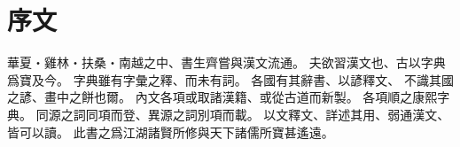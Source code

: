 \chapter*{序文}
華夏・雞林・扶桑・南越之中、書生齊嘗與漢文流通。
夫欲習漢文也、古以字典爲寶及今。
字典雖有字彙之釋、而未有詞。
各國有其辭書、以諺釋文、
不識其國之諺、畫中之餅也爾。
內文各項或取諸漢籍、或從古道而新製。
各項順之康熙字典。
同源之詞同項而登、異源之詞別項而載。
以文釋文、詳述其用、弱通漢文、皆可以讀。
此書之爲江湖諸賢所修與天下諸儒所寶甚遙遠。
